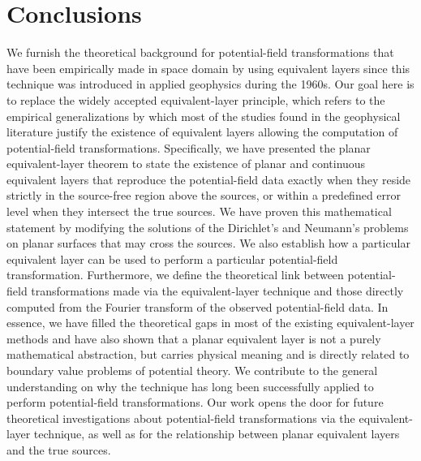 \section{Conclusions}
\label{sec:conclusions}

We furnish the theoretical background for potential-field transformations
that have been empirically made in space domain by using equivalent layers since 
this technique was introduced in applied geophysics during the 1960s.
Our goal here is to replace the widely accepted equivalent-layer principle, which 
refers to the empirical generalizations
by which most of the studies found in the geophysical literature justify the existence of
equivalent layers allowing the computation of potential-field transformations.
Specifically, we have presented the planar equivalent-layer theorem to state
the existence of planar and continuous equivalent layers that 
reproduce the potential-field data exactly when they reside strictly in the source-free 
region above the sources, or within a predefined error level when they intersect the true sources.
We have proven this mathematical statement by modifying the solutions of the 
Dirichlet's and Neumann's problems on planar surfaces that may cross the sources.
We also establish how a particular equivalent layer can be used to perform a particular 
potential-field transformation.
Furthermore, we define the theoretical link between potential-field transformations made 
via the equivalent-layer technique and those directly computed from the Fourier transform of the observed 
potential-field data. 
In essence, we have filled the theoretical gaps in most of the existing equivalent-layer 
methods and have also shown that a planar equivalent layer is not a purely mathematical abstraction,
but carries physical meaning and is directly related to boundary value problems of potential 
theory.
We contribute to the general understanding on why the technique has long been 
successfully applied to perform potential-field transformations. 
Our work opens the door for future theoretical investigations about potential-field 
transformations via the equivalent-layer technique, as well as for the relationship between 
planar equivalent layers and the true sources.